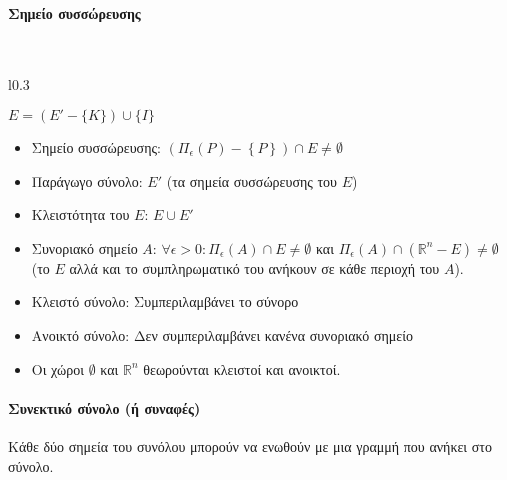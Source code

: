 \documentclass[11pt,a4paper,titlepage,draft]{article}
\begin{document}
\paragraph{Σημείο συσσώρευσης} \hspace{0pt} \\


\begin{wrapfigure}{l}{0.3\textwidth}
\vspace{-40pt}
\end{wrapfigure}

\( E = (E' - \lbrace K\rbrace ) \cup \lbrace I\rbrace \)



\begin{itemize}
\item Σημείο συσσώρευσης: \( \left( \Pi_\epsilon(P) - \left\lbrace P \right\rbrace \right) \cap E \neq \emptyset \)
\item Παράγωγο σύνολο: \(Ε'\) (τα σημεία συσσώρευσης του \(Ε\))
\item Κλειστότητα του \(Ε\): \(Ε \cup E'\)
\item Συνοριακό σημείο \(Α\): \(\forall \epsilon > 0: \Pi_\epsilon(A) \cap E \neq \emptyset\) και \(\Pi_\epsilon(A) \cap \left( \mathbb R^n - E \right) \neq \emptyset\) (το \(Ε\) αλλά και το συμπληρωματικό του ανήκουν σε κάθε περιοχή του \(Α\)).
\item Κλειστό σύνολο: Συμπεριλαμβάνει το σύνορο
\item Ανοικτό σύνολο: Δεν συμπεριλαμβάνει κανένα συνοριακό σημείο
\item Οι χώροι \(\emptyset\) και \( \mathbb R ^ n \) θεωρούνται κλειστοί και ανοικτοί.
\end{itemize}

\paragraph{Συνεκτικό σύνολο (ή συναφές)}
Κάθε δύο σημεία του συνόλου μπορούν να ενωθούν με μια γραμμή που ανήκει στο σύνολο.
\end{document}
